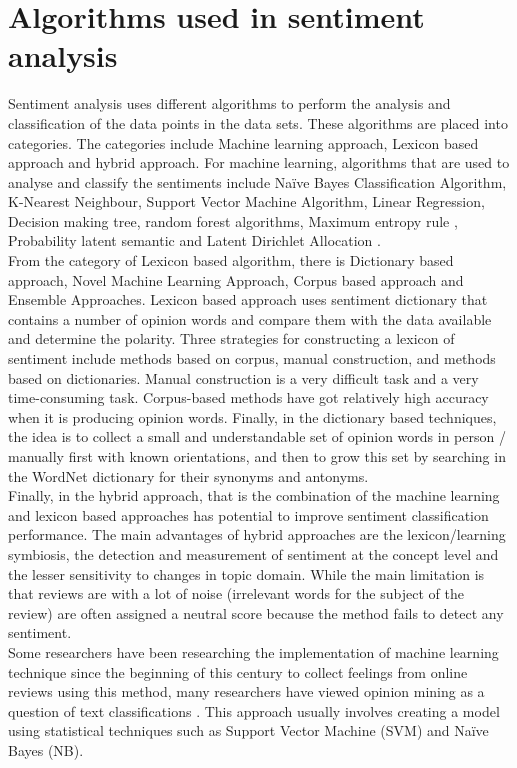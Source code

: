 \documentclass[12pt]{report}
\begin{document}
\section{Algorithms used in sentiment analysis}
Sentiment analysis uses different algorithms to perform the analysis and classification of the data points in the data sets. These algorithms are placed into categories. The categories include Machine learning approach, Lexicon based approach and hybrid approach. For machine learning, algorithms that are used to analyse and classify the sentiments include Naïve Bayes Classification Algorithm, K-Nearest Neighbour, Support Vector Machine Algorithm, Linear Regression, Decision making tree, random forest algorithms, Maximum entropy rule , Probability latent semantic and Latent Dirichlet Allocation \citep{jandail2014proposed}.\\
From the category of Lexicon based algorithm, there is Dictionary based approach, Novel Machine Learning Approach, Corpus based approach and Ensemble Approaches. Lexicon based approach uses sentiment dictionary that contains a number of opinion words and compare them with the data available and determine the polarity. Three strategies for constructing a lexicon of sentiment include methods based on corpus, manual construction, and methods based on dictionaries. Manual construction is a very difficult task and a very time-consuming task. Corpus-based methods have got relatively high accuracy when it is producing opinion words. Finally, in the dictionary based techniques, the idea is to collect a small and understandable set of opinion words in person / manually first with known orientations, and then to grow this set by searching in the WordNet dictionary for their synonyms and antonyms.\\
Finally, in the hybrid approach, that is the combination of the machine learning and lexicon based approaches has potential to improve sentiment classification performance. The main advantages of hybrid approaches are the lexicon/learning symbiosis, the detection and measurement of sentiment at the concept level and the lesser sensitivity to changes in topic domain. While the main limitation is that reviews are with a lot of noise (irrelevant words for the subject of the review) are often assigned a neutral score because the method fails to detect any sentiment.\\
Some researchers have been researching the implementation of machine learning technique since the beginning of this century to collect feelings from online reviews using this method, many researchers have viewed opinion mining as a question of text classifications \citep{jandail2014proposed}. This approach usually involves creating a model using statistical techniques such as Support Vector Machine (SVM) and Naïve Bayes (NB).\\
\end{document}
